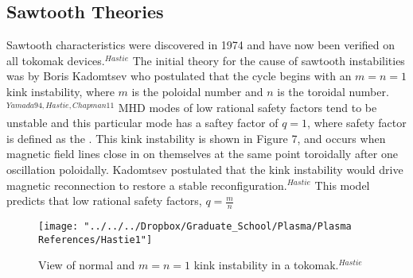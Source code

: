 \documentclass{article}
\begin{document}
\subsection{Sawtooth Theories}
Sawtooth characteristics were discovered in 1974 and have now been verified on all tokomak devices.$^{Hastie}$  The initial theory for the cause of sawtooth instabilities was by Boris Kadomtsev who postulated that the cycle begins with an $m=n=1$ kink instability, where $m$ is the poloidal number and $n$ is the toroidal number.$^{Yamada94,Hastie,Chapman11}$  MHD modes of low rational safety factors tend to be unstable and this particular mode has a saftey factor of $q=1$, where safety factor is defined as the .  This kink instability is shown in Figure 7, and occurs when magnetic field lines close in on themselves at the same point toroidally after one oscillation poloidally.  Kadomtsev postulated that the kink instability would drive magnetic reconnection to restore a stable reconfiguration.$^{Hastie}$  This model predicts that low rational safety factors, $q=\frac{m}{n}$
\begin{figure}[p]
\centering
\texttt{[image: "../../../Dropbox/Graduate\_School/Plasma/Plasma References/Hastie1"]}
\caption{View of normal and $m=n=1$ kink instability in a tokomak.$^{Hastie}$}
\label{fig:Hastie1}
\end{figure}
\newpage
\end{document}
